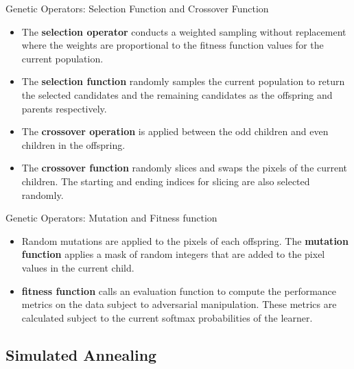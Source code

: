 \documentclass[10pt]{beamer}
\begin{document}
\begin{frame}{Genetic Operators: Selection Function and Crossover Function}
	\begin{itemize}
        \item The {\bf selection operator} conducts a weighted sampling without replacement where the weights are proportional to the fitness function values for the current population. 
        \item The {\bf selection function} randomly samples the current population to return the selected candidates and the remaining candidates as the offspring and parents respectively.
        \item The {\bf crossover operation} is applied between the odd children and even children in the offspring. 
        \item The {\bf crossover function} randomly slices and swaps the pixels of the current children. The starting and ending indices for slicing are also selected randomly.
	\end{itemize}
\end{frame}


\begin{frame}{Genetic Operators: Mutation and Fitness function}
	\begin{itemize}
        \item Random mutations are applied to the pixels of each offspring. The {\bf mutation function} applies a mask of random integers that are added to the pixel values in the current child. 
        \item {\bf fitness function} calls an evaluation function to compute the performance metrics on the data subject to adversarial manipulation. These metrics are calculated subject to the current softmax probabilities of the learner.
	\end{itemize}
\end{frame}


\subsection{Simulated Annealing}
\end{document}
